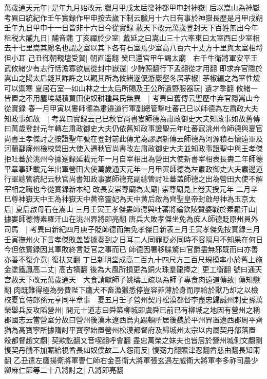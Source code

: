 萬歲通天元年|{
	是年九月始改元}
臘月甲戌太后發神都甲申封神嶽|{
	后以嵩山為神嶽　考異曰統紀作壬午實録作甲申按去歲下制云臘月十六日有事於神嶽長歷是月甲戌朔壬午九日甲申十一日皆非十六日今從實録}
赦天下改元萬歲登封天下百姓無出今年租税大酺九日|{
	酺音蒲}
丁亥禪於少室|{
	戴延之曰嵩山三十六峯東曰太室西曰少室相去十七里嵩其總名也謂之室以其下各有石室焉少室高八百六十丈方十里與太室相埒但小耳}
己丑御朝覲壇受賀|{
	朝直遥翻}
癸巳還宫甲午謁太廟　右千牛衛將軍安平王武攸緒少有志行恬澹寡欲扈從封中嶽還|{
	少詩照翻行下孟翻從才用翻}
即求弃官隱於嵩山之陽太后疑其詐許之以觀其所為攸緒遂優游巖壑冬居茅椒|{
	茅椒編之為室性煖可以禦寒}
夏居石室一如山林之士太后所賜及王公所遺野服器玩|{
	遺才季翻}
攸緒一皆置之不用塵埃凝積買田使奴耕種與民無異　|{
	考異曰舊傳云聖歷中弃官隱嵩山今從實録}
春一月甲寅以婁師德為肅邉道行軍副總管撃吐蕃己巳以師德為左肅政大夫知政事如故　|{
	考異曰實録云己巳秋官尚書婁師德為肅政御史大夫知政事如故舊傳曰萬歲登封元年轉左肅政御史大夫仍依舊知政事證聖元年吐蕃寇洮州令師德與夏官尚書王孝傑討之按證聖年號在登封前此傳尤為謬誤新傳云師德為河源積石懷遠軍及河蘭鄯廓州檢校營田大使入遷秋官尚書改左肅政御史大夫並知政事證聖中與王孝傑拒吐蕃於洮州今據寔録延載元年一月自宰相出為營田大使新書宰相表長夀二年師德平章事延載元年出軍營田大使萬歲通天元年一月甲寅師德為左肅政御史大夫肅邊道行軍總管統紀云秋官尚書知政事婁師德充副總管討吐蕃盖師德之出為營田大使不解宰相之職也今從實録新本紀}
改長安崇尊廟為太廟|{
	崇尊廟見上卷天授元年}
二月辛巳尊神嶽天中王為神嶽天中黄帝靈妃為天中黄后啟為齊聖皇帝封啟母神為玉京太后|{
	夏后啟母石在嵩山}
三月壬寅王孝傑婁師德與吐蕃將論欽陵贊婆戰於素羅汗山|{
	據婁師德傳素羅汗山在洮州界將即亮翻}
唐兵大敗孝傑坐免為庶人師德貶原州員外司馬　|{
	考異曰新紀四月庚子貶師德而無免孝傑日新表三月壬寅孝傑免按實録三月壬寅撫州火下言孝傑敗盖皆據奏到之日耳二人同罪貶必同時不容隔月不知果在何日今但依實録因其軍敗終言貶官之事而已}
師德因署移牒驚曰官爵盡無邪既而曰亦善亦善不復介意|{
	復扶又翻}
丁巳新明堂成高二百九十四尺方三百尺規模率小於舊上施金塗鐵鳳高二丈|{
	高古犒翻}
後為大風所損更為銅火珠羣龍捧之|{
	更工衡翻}
號曰通天宫赦天下改元萬歲通天　大食請獻師子姚璹上疏以為師子專食肉遠道傳致|{
	傳知戀翻}
肉既難得極為勞費陛下鷹犬不畜漁獵悉停豈容菲薄於身而厚給於獸乃却之以檢校夏官侍郎孫元亨同平章事　夏五月壬子營州契丹松漠都督李盡忠歸誠州刺史孫萬榮舉兵反攻䧟營州|{
	開元十道志曰舜築柳城即虞舜已前已有柳城之地因有營州之稱郡國志云當營室分故曰營州後漢末遼西烏丸蹋頓所居後魏於平州界置遼西郡周平齊猶為高寶寧所據隋討平寶寧始置營州松漠都督府及歸城州太宗以内屬契丹部落置}
殺都督趙文翽|{
	契欺訖翻又音喫翻呼會翻}
盡忠萬榮之妹夫也皆居於營州城側文翽剛愎契丹饑不加賑給視酋長如奴僕故二人怨而反|{
	愎弼力翻賑津忍翻酋慈由翻長知兩翻}
乙丑遣左鷹揚衛將軍曹仁師右金吾衛大將軍張玄遇左威衛大將軍李多祚司農少卿麻仁節等二十八將討之|{
	八將即亮翻}
